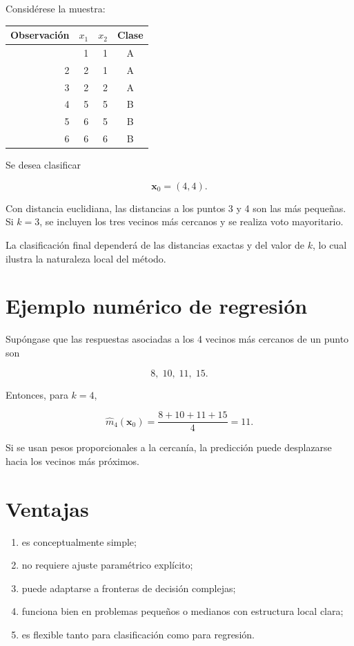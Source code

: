 \documentclass[
  spanish,
  11pt,
  letterpaper,
  DIV=11,
  numbers=noendperiod]{scrreprt}
\newcounter{none} %
\providecommand{\tightlist}{%
  \setlength{\itemsep}{0pt}\setlength{\parskip}{0pt}}
\theoremstyle{definition}
\theoremstyle{plain}
\theoremstyle{definition}
\theoremstyle{remark}
\begin{document}
Considérese la muestra:

{\def\LTcaptype{none} %
\begin{longtable}[]{@{}rrrc@{}}
\toprule\noalign{}
Observación & \(x_1\) & \(x_2\) & Clase \\
\midrule\noalign{}
\endhead
\bottomrule\noalign{}
\endlastfoot
1 & 1 & 1 & A \\
2 & 2 & 1 & A \\
3 & 2 & 2 & A \\
4 & 5 & 5 & B \\
5 & 6 & 5 & B \\
6 & 6 & 6 & B \\
\end{longtable}
}

Se desea clasificar

\[
\mathbf{x}_0=(4,4).
\]

Con distancia euclidiana, las distancias a los puntos 3 y 4 son las más
pequeñas. Si \(k=3\), se incluyen los tres vecinos más cercanos y se
realiza voto mayoritario.

La clasificación final dependerá de las distancias exactas y del valor
de \(k\), lo cual ilustra la naturaleza local del método.

\section{Ejemplo numérico de
regresión}\label{ejemplo-numuxe9rico-de-regresiuxf3n}

Supóngase que las respuestas asociadas a los 4 vecinos más cercanos de
un punto son

\[
8,\;10,\;11,\;15.
\]

Entonces, para \(k=4\),

\[
\widehat{m}_4(\mathbf{x}_0)
=
\frac{8+10+11+15}{4}=11.
\]

Si se usan pesos proporcionales a la cercanía, la predicción puede
desplazarse hacia los vecinos más próximos.

\section{Ventajas}\label{ventajas}

\begin{enumerate}
\def\labelenumi{\arabic{enumi}.}
\tightlist
\item
  es conceptualmente simple;
\item
  no requiere ajuste paramétrico explícito;
\item
  puede adaptarse a fronteras de decisión complejas;
\item
  funciona bien en problemas pequeños o medianos con estructura local
  clara;
\item
  es flexible tanto para clasificación como para regresión.
\end{enumerate}
\end{document}
